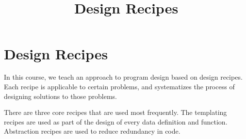 \documentclass[11pt,a4paper]{report}
\title{Design Recipes}
\begin{document}
	\maketitle
	\hypertarget{tocpage}{}
	\tableofcontents
	\clearpage
	\hypertarget{tablist}{}
	\listoftables
	\chapter{Design Recipes}
	In this course, we teach an approach to program design based on design recipes. Each recipe is
	applicable to certain problems, and systematizes the process of designing solutions to those
	problems.
		
	There are three core recipes that are used most frequently. The templating recipes are used as
	part of the design of every data definition and function. Abstraction recipes are used to reduce
	redundancy in code.
\end{document}
